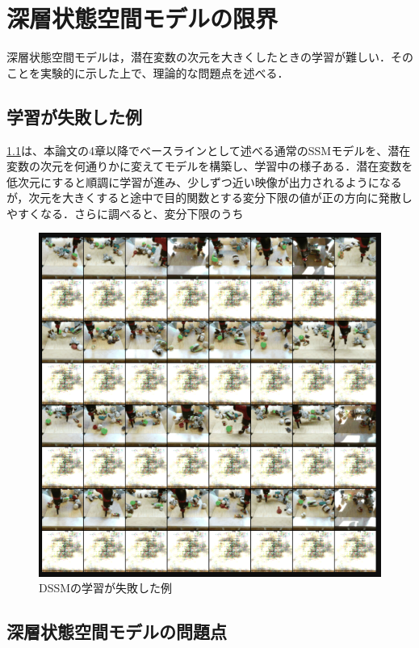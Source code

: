 \chapter{深層状態空間モデルの限界}
\label{chap:baseline}


深層状態空間モデルは，潜在変数の次元を大きくしたときの学習が難しい．そのことを実験的に示した上で、理論的な問題点を述べる．

\section{学習が失敗した例}
\ref{fig:dssm_failure}は、本論文の4章以降でベースラインとして述べる通常のSSMモデルを、潜在変数の次元を何通りかに変えてモデルを構築し、学習中の様子ある．潜在変数を低次元にすると順調に学習が進み、少しずつ近い映像が出力されるようになるが，次元を大きくすると途中で目的関数とする変分下限の値が正の方向に発散しやすくなる．さらに調べると、変分下限のうち


\begin{figure}[tbp]
    \begin{center}
      \includegraphics[width=\linewidth]{./figures/dssm_failure.png}
      \caption{DSSMの学習が失敗した例}
      \label{fig:dssm_failure}
    \end{center}
  \end{figure}

\section{深層状態空間モデルの問題点}


